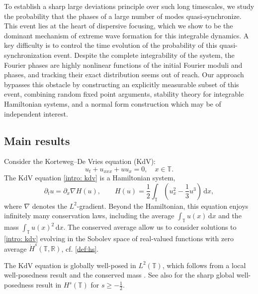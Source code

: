 \documentclass[a4paper,10pt,reqno]{article}
\theoremstyle{definition}
\theoremstyle{plain}
\theoremstyle{plain}
\theoremstyle{definition}
\theoremstyle{plain}
\theoremstyle{plain}
\theoremstyle{plain}
\theoremstyle{definition}
\theoremstyle{definition}
\def \R{\mathbb R}
\def \T{\mathbb{T}}
\begin{document}
\smallskip

To establish a sharp large deviations principle over such long timescales, we study the probability that the phases of a large number of modes quasi-synchronize. This event lies at the heart of dispersive focusing, which we show to be the dominant mechanism of extreme wave formation for this integrable dynamics. A key difficulty is to control the time evolution of the probability of this quasi-synchronization event. Despite the complete integrability of the system, the Fourier phases are highly nonlinear functions of the initial Fourier moduli and phases, and tracking their exact distribution seems out of reach. Our approach bypasses this obstacle by constructing an explicitly measurable subset of this event, combining random fixed point arguments, stability theory for integrable Hamiltonian systems, and a normal form construction which may be of independent interest.

\subsection{Main results} \label{intro: main results}

Consider the Korteweg–De Vries \cite{korteweg} equation (KdV):
\begin{equation} \label{intro: kdv}
u_t + u_{xxx} + uu_x = 0, \quad x \in \T.
\end{equation}
The KdV equation \eqref{intro: kdv} is a Hamiltonian system,
\begin{equation} \label{intro: hamiltonian}
\partial_t u = \partial_x \nabla H(u), \qquad H(u) = \frac{1}{2} \int_{\T} ( u_x^2 - \frac{1}{3} u^3  ) \, \mathrm{d}x,
\end{equation}
where $\nabla$ denotes the $L^2$-gradient. Beyond the Hamiltonian, this equation enjoys infinitely many conservation laws, including the average $\int_{\T} u(x) \, \mathrm{d}x$ and the mass $\int_{\T} u(x)^2 \, \mathrm{d}x$. The conserved average allow us to consider solutions to \eqref{intro: kdv} evolving in the Sobolev space of real-valued functions with zero average $\dot{H}^s(\T,\R)$, cf. \eqref{def:hs}. 

\smallskip

The KdV equation is globally well-posed in
$L^2(\T)$, which follows from a local well-posedness result and the conserved mass \cite{babin,erdogan}. See also \cite{wellposednesskdv} for the sharp global well-posedness result in $H^s(\T)$ for $s \ge -\frac12$. 

\medskip
\end{document}
